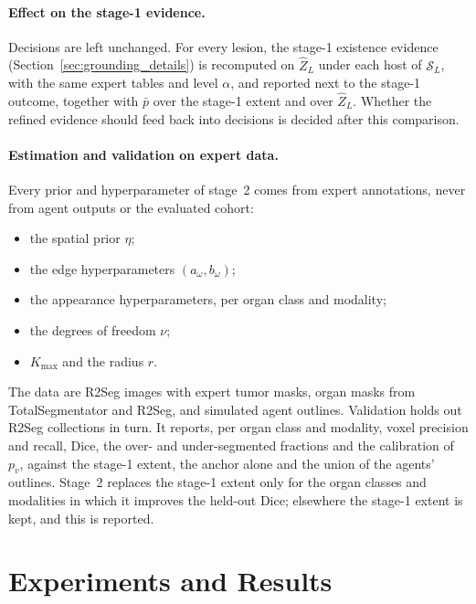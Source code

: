 \documentclass[fleqn,10pt]{olplainarticle}
\begin{document}
\paragraph{Effect on the stage-1 evidence.} Decisions are left unchanged. For every lesion, the stage-1 existence evidence
(Section~\ref{sec:grounding_details}) is recomputed on $\hat Z_L$ under each host of $\mathcal{S}_L$, with the same expert
tables and level $\alpha$, and reported next to the stage-1 outcome, together with $\bar p$ over the stage-1 extent and
over $\hat Z_L$. Whether the refined evidence should feed back into decisions is decided after this comparison.

\paragraph{Estimation and validation on expert data.} Every prior and hyperparameter of stage~2 comes from expert
annotations, never from agent outputs or the evaluated cohort:
\begin{itemize}
\item the spatial prior $\eta$;
\item the edge hyperparameters $(a_\omega,b_\omega)$;
\item the appearance hyperparameters, per organ class and modality;
\item the degrees of freedom $\nu$;
\item $K_{\max}$ and the radius $r$.
\end{itemize}
The data are R2Seg images with expert tumor masks, organ masks from TotalSegmentator and R2Seg, and simulated agent
outlines. Validation holds out R2Seg collections in turn. It reports, per organ class and modality, voxel precision and
recall, Dice, the over- and under-segmented fractions and the calibration of $p_v$, against the stage-1 extent, the anchor
alone and the union of the agents' outlines. Stage~2 replaces the stage-1 extent only for the organ classes and modalities
in which it improves the held-out Dice; elsewhere the stage-1 extent is kept, and this is reported.

\section{Experiments and Results}
\label{sec:results}
\end{document}
